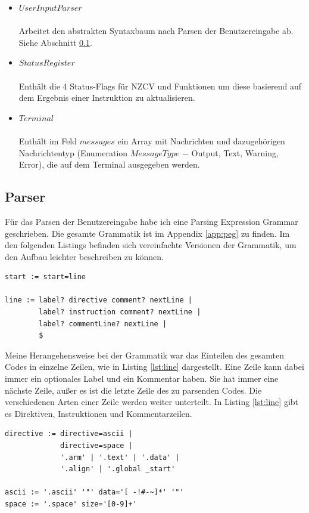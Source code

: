 \documentclass[a4paper, 11pt, onecolumn]{article}
\begin{document}
\begin{itemize}
\item $UserInputParser$\\ \\Arbeitet den abstrakten Syntaxbaum nach Parsen der Benutzereingabe ab. Siehe Abschnitt \ref{sec:parser}.
\item $StatusRegister$\\ \\Enthält die 4 Status-Flags für NZCV und Funktionen um diese basierend auf dem Ergebnis einer Instruktion zu aktualisieren.
\item $Terminal$\\ \\Enthält im Feld $messages$ ein Array mit Nachrichten und dazugehörigen Nachrichtentyp (Enumeration $MessageType$ $-$ Output, Text, Warning, Error), die auf dem Terminal ausgegeben werden.
\end{itemize}

\subsection{Parser}\label{sec:parser}

Für das Parsen der Benutzereingabe habe ich eine Parsing Expression Grammar \cite{peg} geschrieben. Die gesamte Grammatik ist im Appendix \ref{app:peg} zu finden. Im den folgenden Listings befinden sich vereinfachte Versionen der Grammatik, um den Aufbau leichter beschreiben zu können.\\

\begin{lstlisting}[basicstyle=\ttfamily\footnotesize, backgroundcolor=\color{backcolour}, caption={Einteilung in Zeilen},captionpos=b, label={lst:line}]
start := start=line

line := label? directive comment? nextLine |
        label? instruction comment? nextLine |
        label? commentLine? nextLine |
        $
\end{lstlisting}

Meine Herangehensweise bei der Grammatik war das Einteilen des gesamten Codes in einzelne Zeilen, wie in Listing \ref{lst:line} dargestellt. Eine Zeile kann dabei immer ein optionales Label und ein Kommentar haben. Sie hat immer eine nächste Zeile, außer es ist die letzte Zeile des zu parsenden Codes. Die verschiedenen Arten einer Zeile werden weiter unterteilt. In Listing \ref{lst:line} gibt es Direktiven, Instruktionen und Kommentarzeilen. \\

\begin{lstlisting}[basicstyle=\ttfamily\footnotesize, backgroundcolor=\color{backcolour}, caption={Direktiven}, captionpos=b, label={lst:directive}]
directive := directive=ascii |
             directive=space |
             '.arm' | '.text' | '.data' |
             '.align' | '.global _start'

ascii := '.ascii' '"' data='[ -!#-~]*' '"'
space := '.space' size='[0-9]+'
\end{lstlisting}
\end{document}

